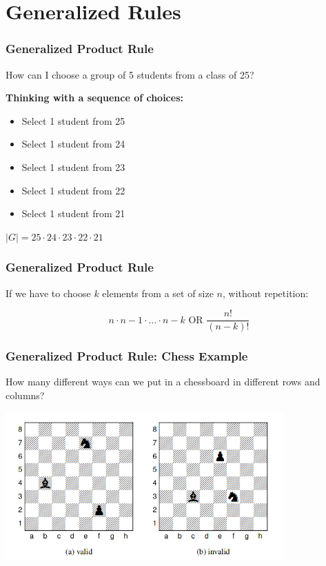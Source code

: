 \documentclass{beamer}
\begin{document}
\section{Generalized Rules}

\begin{frame}
  \frametitle{Generalized Product Rule}

  {\larger

    How can I choose a \alert{group of 5 students} from a class of 25?

    \bigskip

    {\bf Thinking with a sequence of choices:}
    \begin{itemize}
    \item Select 1 student from 25
    \item Select 1 student from 24
    \item Select 1 student from 23
    \item Select 1 student from 22
    \item Select 1 student from 21
    \end{itemize}
    
    \bigskip
    
    $|G| = 25\cdot24\cdot23\cdot22\cdot21$
  }
\end{frame}

\begin{frame}
  \frametitle{Generalized Product Rule}

  {\larger

    If we have to choose $k$ elements from a set of size $n$,
    \alert{without repetition}:

    \begin{equation}
      n\cdot n-1\cdot\ldots\cdot n-k \text{ OR } \frac{n!}{(n-k)!}
    \end{equation}

  }

  
\end{frame}

\begin{frame}
  \frametitle{Generalized Product Rule: Chess Example}

  {\larger
  How many different ways can we put  in a chessboard \alert{in different rows and columns}?

  \bigskip

  \begin{center}
    \includegraphics[width=0.8\textwidth]{../img/chess_count1}
  \end{center}
  }
  
\end{frame}
\end{document}
